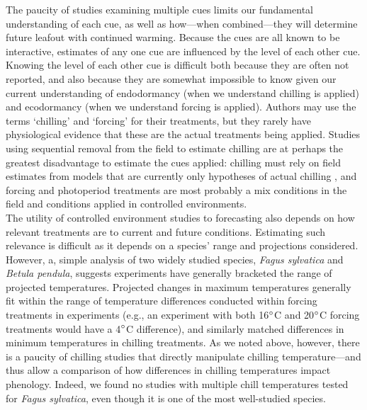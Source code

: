 \documentclass[11pt,letter]{article}
\begin{document}
The paucity of studies examining multiple cues limits our fundamental understanding of each cue, as well as how---when combined---they will determine future leafout with continued warming. Because the cues are all known to be interactive, estimates of any one cue are influenced by the level of each other cue. Knowing the level of each other cue is difficult both because they are often not reported, and also because they are somewhat impossible to know given our current understanding of endodormancy (when we understand chilling is applied) and ecodormancy (when we understand forcing is applied). Authors may use the terms `chilling' and `forcing' for their treatments, but they rarely have physiological evidence that these are the actual treatments being applied. Studies using sequential removal from the field to estimate chilling are at perhaps the greatest disadvantage to estimate the cues applied: chilling must rely on field estimates from models that are currently only hypotheses of actual chilling \citep{dennis2003}, and forcing and photoperiod treatments are most probably a mix conditions in the field and conditions applied in controlled environments. \\%

The utility of controlled environment studies to forecasting also depends on how relevant treatments are to current and future conditions. Estimating such relevance is difficult as it depends on a species' range and projections considered. However, a, simple analysis of two widely studied species, \emph{Fagus sylvatica} and \emph{Betula pendula}, suggests experiments have generally bracketed the range of projected temperatures. Projected changes in maximum temperatures generally fit within the range of temperature differences conducted within forcing treatments in experiments (e.g., an experiment with both 16$\degree$C  and 20$\degree$C forcing treatments would have a 4$\degree$C difference), and similarly matched differences in minimum temperatures in chilling treatments. As we noted above, however, there is a paucity of chilling studies that directly manipulate chilling temperature---and thus allow a comparison of how differences in chilling temperatures impact phenology. Indeed, we found no studies with multiple chill temperatures tested for \emph{Fagus sylvatica}, even though it is one of the most well-studied species. \\
\end{document}
